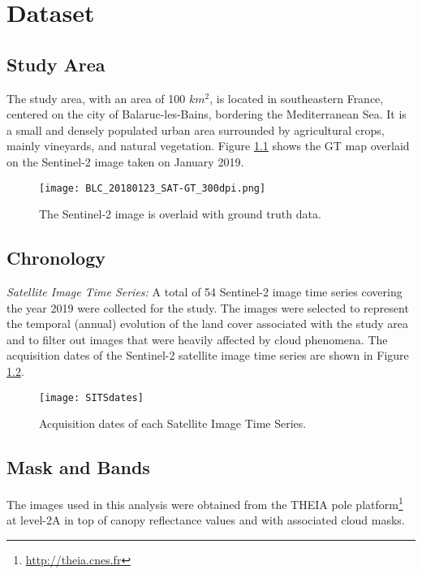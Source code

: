\chapter{Dataset}

\section{Study Area}
The study area, with an area of 100 $km^2$, is located in southeastern France, centered on the city of Balaruc-les-Bains, bordering the Mediterranean Sea. 
It is a small and densely populated urban area surrounded by agricultural crops, mainly vineyards, and natural vegetation.
Figure \ref{fig:gtmap} shows the GT map overlaid on the Sentinel-2 image taken on January 2019.

\begin{figure}[H]
  \centering
  \texttt{[image: BLC\_20180123\_SAT-GT\_300dpi.png]}
  \caption{The Sentinel-2 image is overlaid with ground truth data.}
  \label{fig:gtmap}
\end{figure}


\section{Chronology}

\textit{Satellite Image Time Series:} 
A total of 54 Sentinel-2 image time series covering the year 2019 were collected for the study. 
The images were selected to represent the temporal (annual) evolution of the land cover associated with the study area and to filter out images that were heavily affected by cloud phenomena.
The acquisition dates of the Sentinel-2 satellite image time series are shown in Figure \ref{fig:sitsdates}.

\begin{figure}[H]
  \centering
  \texttt{[image: SITSdates]}
  \caption{Acquisition dates of each Satellite Image Time Series.}
  \label{fig:sitsdates}
\end{figure}

\section{Mask and Bands}


The images used in this analysis were obtained from the THEIA pole platform\footnote{\url{http://theia.cnes.fr}} at level-2A in top of canopy reflectance values and with associated cloud masks.

